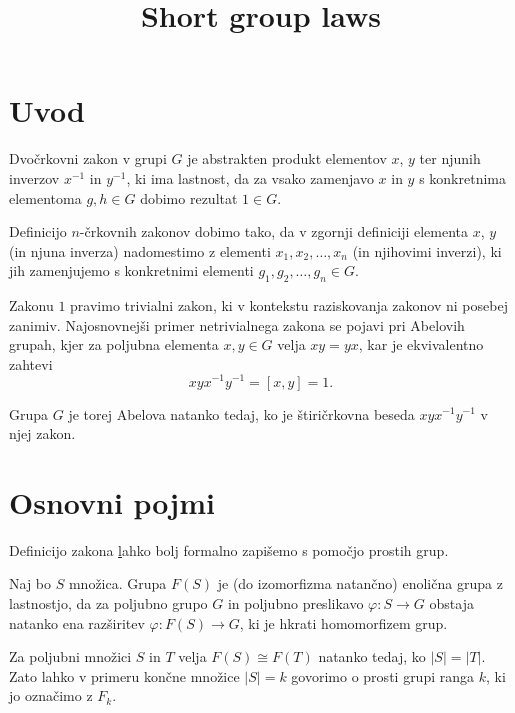 \documentclass[mat1, tisk]{fmfdelo}
\title{Short group laws}
\begin{document}
\section{Uvod}


Dvočrkovni zakon v grupi $G$ je abstrakten produkt elementov $x$, $y$ ter njunih inverzov $x^{-1}$ in $y^{-1}$, ki ima lastnost, da za vsako zamenjavo $x$ in $y$ s konkretnima
elementoma $g, h \in G$ dobimo rezultat $1 \in G$.

\begin{opomba}
Definicijo $n$-črkovnih zakonov dobimo tako, da v zgornji definiciji elementa $x$, $y$ (in njuna inverza) nadomestimo z elementi $x_1, x_2, \ldots, x_n$ (in njihovimi inverzi),
ki jih zamenjujemo s konkretnimi elementi $g_1, g_2, \ldots, g_{n} \in G$.
\end{opomba}

\noindent
Zakonu $1$ pravimo trivialni zakon, ki v kontekstu raziskovanja zakonov ni posebej zanimiv. Najosnovnejši primer netrivialnega zakona se pojavi pri Abelovih grupah, kjer za poljubna elementa $x,y \in  G$ velja $xy = yx$, kar je ekvivalentno
zahtevi \begin{equation*}
xyx^{-1}y^{-1} = [x,y] = 1.
\end{equation*}

\noindent
Grupa $G$ je torej Abelova natanko tedaj, ko je štiričrkovna beseda $xyx^{-1}y^{-1}$ v njej zakon. 


\section{Osnovni pojmi}

Definicijo zakona \href{def_zakon_osnovna} lahko bolj formalno zapišemo s pomočjo prostih grup.

\begin{definicija}
\label{def_prosta_grupa}
Naj bo $S$ množica. Grupa $F(S)$ je (do izomorfizma natančno) enolična grupa z lastnostjo, da za poljubno grupo $G$ in poljubno preslikavo
$\varphi: S \to G$ obstaja natanko ena razširitev $\varphi: F(S) \to G$, ki je hkrati homomorfizem grup. 
\end{definicija}

\begin{opomba}
Za poljubni množici $S$ in $T$ velja $F(S) \cong F(T)$ natanko tedaj, ko $\lvert S \rvert = \lvert T \rvert$. Zato lahko v primeru končne množice $\lvert S \rvert = k$ govorimo o 
prosti grupi ranga $k$, ki jo označimo z $F_k$.
\end{opomba}
\end{document}
